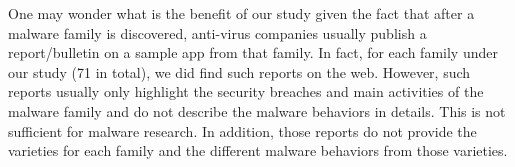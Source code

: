 One may wonder what is the benefit of our study given the fact that
after a malware family is discovered, anti-virus companies usually publish 
a report/bulletin on a sample app from that family. 
In fact, for each family under our study (71 in total), we did find such 
reports on the web. %
However, such reports usually only highlight the security breaches and 
main activities of the malware family and do not describe the malware behaviors in details.
This is not sufficient for malware research. In addition, those reports do not provide 
the varieties for each family and the different malware behaviors from those varieties. 


